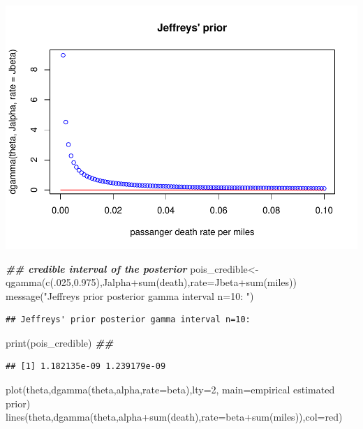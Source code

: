\documentclass[
]{book}
\newenvironment{Shaded}{\begin{snugshade}}{\end{snugshade}}
\newcommand{\AttributeTok}[1]{\textcolor[rgb]{0.77,0.63,0.00}{#1}}
\newcommand{\DecValTok}[1]{\textcolor[rgb]{0.00,0.00,0.81}{#1}}
\newcommand{\DocumentationTok}[1]{\textcolor[rgb]{0.56,0.35,0.01}{\textbf{\textit{#1}}}}
\newcommand{\FloatTok}[1]{\textcolor[rgb]{0.00,0.00,0.81}{#1}}
\newcommand{\FunctionTok}[1]{\textcolor[rgb]{0.00,0.00,0.00}{#1}}
\newcommand{\NormalTok}[1]{#1}
\newcommand{\OtherTok}[1]{\textcolor[rgb]{0.56,0.35,0.01}{#1}}
\newcommand{\SpecialCharTok}[1]{\textcolor[rgb]{0.00,0.00,0.00}{#1}}
\newcommand{\StringTok}[1]{\textcolor[rgb]{0.31,0.60,0.02}{#1}}
\theoremstyle{definition}
\theoremstyle{definition}
\theoremstyle{definition}
\theoremstyle{definition}
\theoremstyle{remark}
\begin{document}
\includegraphics{_main_files/figure-latex/unnamed-chunk-27-1.pdf}

\begin{Shaded}
\begin{Highlighting}[]
 \DocumentationTok{\#\# credible interval of the posterior}
\NormalTok{ pois\_credible}\OtherTok{\textless{}{-}}\FunctionTok{qgamma}\NormalTok{(}\FunctionTok{c}\NormalTok{(.}\DecValTok{025}\NormalTok{,}\FloatTok{0.975}\NormalTok{),Jalpha}\SpecialCharTok{+}\FunctionTok{sum}\NormalTok{(death),}\AttributeTok{rate=}\NormalTok{Jbeta}\SpecialCharTok{+}\FunctionTok{sum}\NormalTok{(miles))}
 \FunctionTok{message}\NormalTok{(}\StringTok{"Jeffreys\textquotesingle{} prior posterior gamma interval n=10: "}\NormalTok{)}
\end{Highlighting}
\end{Shaded}

\begin{verbatim}
## Jeffreys' prior posterior gamma interval n=10:
\end{verbatim}

\begin{Shaded}
\begin{Highlighting}[]
 \FunctionTok{print}\NormalTok{(pois\_credible) }\DocumentationTok{\#\# }
\end{Highlighting}
\end{Shaded}

\begin{verbatim}
## [1] 1.182135e-09 1.239179e-09
\end{verbatim}

\begin{Shaded}
\begin{Highlighting}[]
 \FunctionTok{plot}\NormalTok{(theta,}\FunctionTok{dgamma}\NormalTok{(theta,alpha,}\AttributeTok{rate=}\NormalTok{beta),}\AttributeTok{lty=}\DecValTok{2}\NormalTok{, }\AttributeTok{main=}\StringTok{\textquotesingle{}empirical estimated prior\textquotesingle{}}\NormalTok{)}
\FunctionTok{lines}\NormalTok{(theta,}\FunctionTok{dgamma}\NormalTok{(theta,alpha}\SpecialCharTok{+}\FunctionTok{sum}\NormalTok{(death),}\AttributeTok{rate=}\NormalTok{beta}\SpecialCharTok{+}\FunctionTok{sum}\NormalTok{(miles)),}\AttributeTok{col=}\StringTok{\textquotesingle{}red\textquotesingle{}}\NormalTok{)}
\end{Highlighting}
\end{Shaded}
\end{document}
